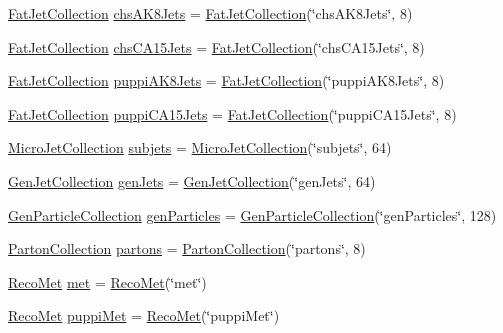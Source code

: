 \begin{DoxyCompactItemize}
\item 
\hyperlink{classpanda_1_1Collection}{FatJetCollection} \hyperlink{classpanda_1_1Event_a5887b3707f5bb76d2cda32c7e42d83f5}{chsAK8Jets} = \hyperlink{classpanda_1_1Collection}{FatJetCollection}(\char`\"{}chsAK8Jets\char`\"{}, 8)
\item 
\hyperlink{classpanda_1_1Collection}{FatJetCollection} \hyperlink{classpanda_1_1Event_af49dd838ad102b13582e62cb63241262}{chsCA15Jets} = \hyperlink{classpanda_1_1Collection}{FatJetCollection}(\char`\"{}chsCA15Jets\char`\"{}, 8)
\item 
\hyperlink{classpanda_1_1Collection}{FatJetCollection} \hyperlink{classpanda_1_1Event_a91c57207214b8717ad431863fc9ecfa2}{puppiAK8Jets} = \hyperlink{classpanda_1_1Collection}{FatJetCollection}(\char`\"{}puppiAK8Jets\char`\"{}, 8)
\item 
\hyperlink{classpanda_1_1Collection}{FatJetCollection} \hyperlink{classpanda_1_1Event_ad8c6b6c76a6993c8534468bac18dac25}{puppiCA15Jets} = \hyperlink{classpanda_1_1Collection}{FatJetCollection}(\char`\"{}puppiCA15Jets\char`\"{}, 8)
\item 
\hyperlink{classpanda_1_1Collection}{MicroJetCollection} \hyperlink{classpanda_1_1Event_a1e2ae9be493032383891406a863ef205}{subjets} = \hyperlink{classpanda_1_1Collection}{MicroJetCollection}(\char`\"{}subjets\char`\"{}, 64)
\item 
\hyperlink{classpanda_1_1Collection}{GenJetCollection} \hyperlink{classpanda_1_1Event_ae3a54af82a3cdb9e752c4b94cbf5fb48}{genJets} = \hyperlink{classpanda_1_1Collection}{GenJetCollection}(\char`\"{}genJets\char`\"{}, 64)
\item 
\hyperlink{classpanda_1_1Collection}{GenParticleCollection} \hyperlink{classpanda_1_1Event_ab586e3c06b59b23f2d2869a7e5d28648}{genParticles} = \hyperlink{classpanda_1_1Collection}{GenParticleCollection}(\char`\"{}genParticles\char`\"{}, 128)
\item 
\hyperlink{classpanda_1_1Collection}{PartonCollection} \hyperlink{classpanda_1_1Event_a55b3657dc273e8cec935272856474440}{partons} = \hyperlink{classpanda_1_1Collection}{PartonCollection}(\char`\"{}partons\char`\"{}, 8)
\item 
\hyperlink{classpanda_1_1RecoMet}{RecoMet} \hyperlink{classpanda_1_1Event_a11d22b206ec84054ea9eb095026ed551}{met} = \hyperlink{classpanda_1_1RecoMet}{RecoMet}(\char`\"{}met\char`\"{})
\item 
\hyperlink{classpanda_1_1RecoMet}{RecoMet} \hyperlink{classpanda_1_1Event_a3bbffdefa6d28927466053f51a1cbae3}{puppiMet} = \hyperlink{classpanda_1_1RecoMet}{RecoMet}(\char`\"{}puppiMet\char`\"{})

\end{DoxyCompactItemize}
